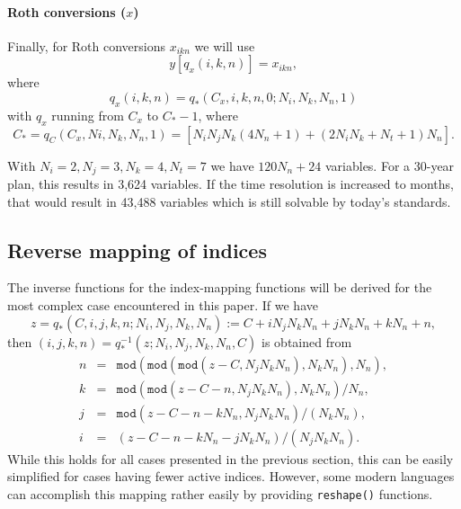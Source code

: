 \documentclass{article}[fleqn,12pt]
\begin{document}
\paragraph*{Roth conversions (\boldmath$x$)}
Finally, for Roth conversions $x_{ikn}$ we will use
\begin{equation}
	y[q_x(i, k, n)] = x_{i k n},
\end{equation}
where
\begin{equation}
	q_x(i, k, n) = q_*(C_x, i, k, n, 0; N_i, N_k, N_n, 1)
\end{equation}
with $q_x$ running from $C_x$ to $C_* - 1$, where
\[
	C_* = q_C(C_x, Ni, N_k, N_n, 1) = [N_iN_jN_k(4N_n + 1) + (2N_iN_k + N_t + 1) N_n].
\]

With $N_i = 2, N_j = 3, N_k = 4, N_t = 7$ we have $120N_n + 24$ variables. For
a 30-year plan, this results in 3,624 variables. If the time resolution is increased to
months, that would result in 43,488 variables which is still solvable by today's standards.

\subsection{Reverse mapping of indices}
The inverse functions for the index-mapping functions will be derived for the
most complex case encountered in this paper.
If we have
\begin{equation}
	z = q_*(C, i, j, k, n; N_i, N_j, N_k, N_n) := C + iN_jN_kN_n + jN_kN_n + kN_n + n,
\end{equation}
then $(i, j, k, n) = q_*^{-1}(z; N_i, N_j, N_k, N_n, C)$ is obtained from
\begin{eqnarray}
	n &=& \texttt{mod}(\texttt{mod}(\texttt{mod}(z - C, N_jN_kN_n), N_kN_n), N_n), \nonumber \\
	k &=& \texttt{mod}(\texttt{mod}(z - C - n, N_jN_kN_n), N_kN_n)/N_n, \nonumber \\
	j &=& \texttt{mod}(z - C - n - kN_n, N_jN_kN_n)/(N_kN_n), \nonumber \\
	i &=& (z - C - n - kN_n - jN_kN_n)/(N_jN_kN_n).
\end{eqnarray}
While this holds for all cases presented in the previous section, this can be easily simplified
for cases having fewer active indices. However, some modern languages can accomplish this
mapping rather easily by providing \texttt{reshape()} functions.
\end{document}
